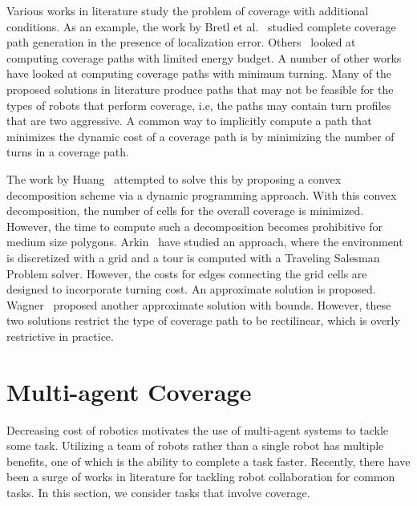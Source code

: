 \documentclass[../main.tex]{subfiles}
\begin{document}
Various works in literature study the problem of coverage with additional conditions. As an example, the work by Bretl et al.~\cite{bretl2013robust} studied complete coverage path generation in the presence of localization error. Others~\cite{shnaps2015line} looked at computing coverage paths with limited energy budget. A number of other works have looked at computing coverage paths with minimum turning. Many of the proposed solutions in literature produce paths that may not be feasible for the types of robots that perform coverage, i.e, the paths may contain turn profiles that are two aggressive. A common way to implicitly compute a path that minimizes the dynamic cost of a coverage path is by minimizing the number of turns in a coverage path. 

The work by Huang~\cite{Huang2001optimal} attempted to solve this by proposing a convex decomposition scheme via a dynamic programming approach. With this convex decomposition, the number of cells for the overall coverage is minimized. However, the time to compute such a decomposition becomes prohibitive for medium size polygons. Arkin~\cite{arkin2005optimal} have studied an approach, where the environment is discretized with a grid and a tour is computed with a Traveling Salesman Problem solver. However, the costs for edges connecting the grid cells are designed to incorporate turning cost. An approximate solution is proposed. Wagner~\cite{wagner2001approximation} proposed another approximate solution with bounds. However, these two solutions restrict the type of coverage path to be rectilinear, which is overly restrictive in practice.


\section{Multi-agent Coverage}
\label{section:multi_agent_coverage_lit_review}

Decreasing cost of robotics motivates the use of multi-agent systems to tackle some task. Utilizing a team of robots rather than a single robot has multiple benefits, one of which is the ability to complete a task faster. Recently, there have been a surge of works in literature for tackling robot collaboration for common tasks. In this section, we consider tasks that involve coverage.
\end{document}
